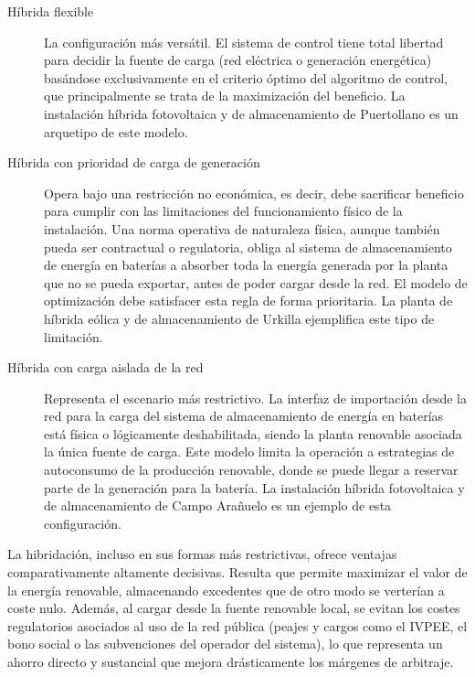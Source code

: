 \begin{description}

  \item[Híbrida flexible] La configuración más versátil. El sistema de control tiene total libertad para decidir la fuente de carga (red eléctrica o generación energética) basándose exclusivamente en el criterio óptimo del algoritmo de control, que principalmente se trata de la maximización del beneficio. La instalación híbrida fotovoltaica y de almacenamiento de Puertollano es un arquetipo de este modelo.

  \item[Híbrida con prioridad de carga de generación] Opera bajo una restricción no económica, es decir, debe sacrificar beneficio para cumplir con las limitaciones del funcionamiento físico de la instalación. Una norma operativa de naturaleza física, aunque también pueda ser contractual o regulatoria, obliga al sistema de almacenamiento de energía en baterías a absorber toda la energía generada por la planta que no se pueda exportar, antes de poder cargar desde la red. El modelo de optimización debe satisfacer esta regla de forma prioritaria. La planta de híbrida eólica y de almacenamiento de Urkilla ejemplifica este tipo de limitación.

  \item[Híbrida con carga aislada de la red] Representa el escenario más restrictivo. La interfaz de importación desde la red para la carga del sistema de almacenamiento de energía en baterías está física o lógicamente deshabilitada, siendo la planta renovable asociada la única fuente de carga. Este modelo limita la operación a estrategias de autoconsumo de la producción renovable, donde se puede llegar a reservar parte de la generación para la batería. La instalación híbrida fotovoltaica y de almacenamiento de Campo Arañuelo es un ejemplo de esta configuración.

\end{description}

La hibridación, incluso en sus formas más restrictivas, ofrece ventajas comparativamente altamente decisivas. Resulta que permite maximizar el valor de la energía renovable, almacenando excedentes que de otro modo se verterían a coste nulo. Además, al cargar desde la fuente renovable local, se evitan los costes regulatorios asociados al uso de la red pública (peajes y cargos como el IVPEE, el bono social o las subvenciones del operador del sistema), lo que representa un ahorro directo y sustancial que mejora drásticamente los márgenes de arbitraje.


